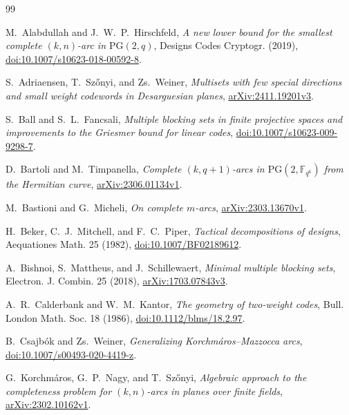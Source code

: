 \documentclass[11pt]{article}
\numberwithin{equation}{section}
\theoremstyle{definition}
\theoremstyle{remark}
\newcommand{\PG}{\mathrm{PG}}
\begin{document}
\footnotesize
\raggedright
\begin{thebibliography}{99}

M.~Alabdullah and J.~W.~P.~Hirschfeld,
\emph{A new lower bound for the smallest complete \((k,n)\)-arc in
\(\PG(2,q)\)}, Designs Codes Cryptogr. (2019),
\href{https://doi.org/10.1007/s10623-018-00592-8}{doi:10.1007/s10623-018-00592-8}.

S.~Adriaensen, T.~Sz\H{o}nyi, and Zs.~Weiner,
\emph{Multisets with few special directions and small weight codewords in
Desarguesian planes},
\href{https://arxiv.org/abs/2411.19201}{arXiv:2411.19201v3}.

S.~Ball and S.~L.~Fancsali,
\emph{Multiple blocking sets in finite projective spaces and improvements to
the Griesmer bound for linear codes},
\href{https://doi.org/10.1007/s10623-009-9298-7}{doi:10.1007/s10623-009-9298-7}.

D.~Bartoli and M.~Timpanella,
\emph{Complete \((k,q+1)\)-arcs in \(\PG(2,\mathbb F_{q^6})\) from the
Hermitian curve},
\href{https://arxiv.org/abs/2306.01134}{arXiv:2306.01134v1}.

M.~Bastioni and G.~Micheli,
\emph{On complete \(m\)-arcs},
\href{https://arxiv.org/abs/2303.13670}{arXiv:2303.13670v1}.

H.~Beker, C.~J.~Mitchell, and F.~C.~Piper,
\emph{Tactical decompositions of designs}, Aequationes Math. 25 (1982),
\href{https://doi.org/10.1007/BF02189612}{doi:10.1007/BF02189612}.

A.~Bishnoi, S.~Mattheus, and J.~Schillewaert,
\emph{Minimal multiple blocking sets}, Electron. J. Combin. 25 (2018),
\href{https://arxiv.org/abs/1703.07843}{arXiv:1703.07843v3}.

A.~R.~Calderbank and W.~M.~Kantor,
\emph{The geometry of two-weight codes}, Bull. London Math. Soc. 18 (1986),
\href{https://doi.org/10.1112/blms/18.2.97}{doi:10.1112/blms/18.2.97}.

B.~Csajb\'ok and Zs.~Weiner,
\emph{Generalizing Korchm\'aros--Mazzocca arcs},
\href{https://doi.org/10.1007/s00493-020-4419-z}{doi:10.1007/s00493-020-4419-z}.

G.~Korchm\'aros, G.~P.~Nagy, and T.~Sz\H{o}nyi,
\emph{Algebraic approach to the completeness problem for \((k,n)\)-arcs in
planes over finite fields},
\href{https://arxiv.org/abs/2302.10162}{arXiv:2302.10162v1}.


\end{thebibliography}
\end{document}
